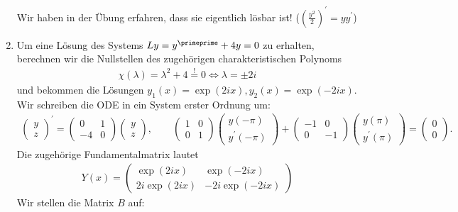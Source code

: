 \begin{solution}
\begin{enumerate}[label = \textbf{\alph*)}]
  Wir haben in der Übung erfahren, dass sie eigentlich lösbar ist! ($\left(\frac{y^2}2\right)^\prime = yy^\prime$)
  \item Um eine Lösung des Systems $Ly = y^{\primeprime} + 4y = 0$
  zu erhalten, berechnen wir die Nullstellen des zugehörigen charakteristischen Polynoms
  \begin{align*}
    \chi(\lambda) = \lambda^2 + 4 \stackrel{!}{=} 0 \iff \lambda = \pm2i
  \end{align*}
  und bekommen die Lösungen $y_1(x) = \exp(2ix), y_2(x) = \exp(-2ix)$.
  Wir schreiben die ODE in ein System erster Ordnung um:
  \begin{align*}
    \begin{pmatrix}
      y \\ z
    \end{pmatrix}^{\prime} =
    \begin{pmatrix}
      0 & 1 \\ -4 & 0
    \end{pmatrix}
    \begin{pmatrix}
      y \\ z
    \end{pmatrix}, \qquad
    \begin{pmatrix}
      1 & 0 \\ 0 & 1
    \end{pmatrix}
    \begin{pmatrix}
      y(-\pi) \\ y^{\prime}(-\pi)
    \end{pmatrix}
    +
    \begin{pmatrix}
      -1 & 0 \\ 0 & -1
    \end{pmatrix}
    \begin{pmatrix}
      y(\pi) \\ y^{\prime}(\pi)
    \end{pmatrix}
    =
    \begin{pmatrix}
      0 \\ 0
    \end{pmatrix}.
  \end{align*}
  Die zugehörige Fundamentalmatrix lautet
  \begin{align*}
    Y(x) = \begin{pmatrix}
      \exp(2ix) & \exp(-2ix) \\ 2i\exp(2ix) & -2i\exp(-2ix)
    \end{pmatrix}
  \end{align*}
  Wir stellen die Matrix $B$ auf:

\end{enumerate}
\end{solution}

